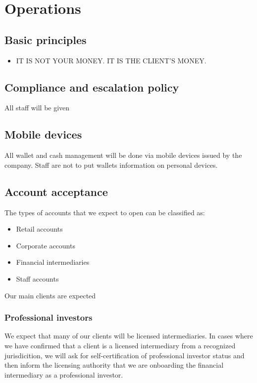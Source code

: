 \chapter{Operations}

\section{Basic principles}

\begin{itemize}
\item IT IS NOT YOUR MONEY.  IT IS THE CLIENT'S MONEY.
\end{itemize}

\section{Compliance and escalation policy}

All staff will be given

\section{Mobile devices}
All wallet and cash management will be done via mobile devices issued
by the company.  Staff are not to put wallets information on personal
devices.

\section{Account acceptance}

The types of accounts that we expect to open can be classified as:

\begin{itemize}
\item Retail accounts
  \item Corporate accounts
\item Financial intermediaries
\item Staff accounts
  \end{itemize}

Our main clients are expected

\subsection{Professional investors}
We expect that many of our clients will be licensed intermediaries.
In cases where we have confirmed that a client is a licensed
intermediary from a recognized jurisdicition, we will ask for
self-certification of professional investor status and then inform the
licensing authority that we are onboarding the financial intermediary
as a professional investor.


